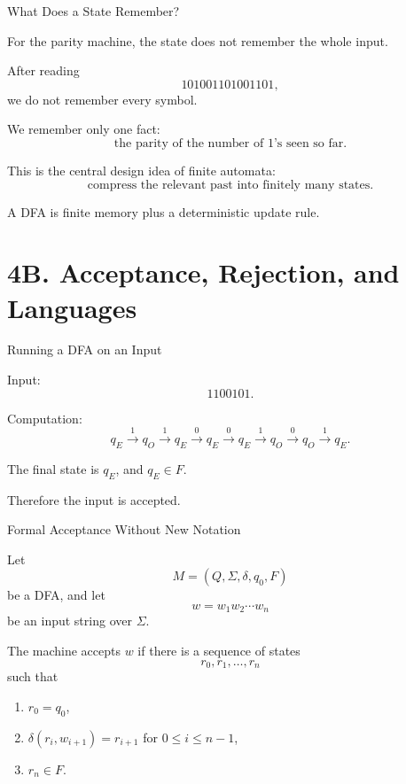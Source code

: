 \documentclass[10pt,aspectratio=169]{beamer}
\begin{document}
\begin{frame}{What Does a State Remember?}

For the parity machine, the state does not remember the whole input.

\pause

After reading
\[
101001101001101,
\]
we do not remember every symbol.

\pause

We remember only one fact:
\[
\text{the parity of the number of }1\text{'s seen so far}.
\]

\pause

This is the central design idea of finite automata:
\[
\text{compress the relevant past into finitely many states.}
\]

\end{frame}

\begin{frame}[standout]
A DFA is finite memory plus a deterministic update rule.
\end{frame}

\section{4B. Acceptance, Rejection, and Languages}

\begin{frame}{Running a DFA on an Input}

Input:
\[
1100101.
\]

\pause

Computation:
\[
q_E
\xrightarrow{1}
q_O
\xrightarrow{1}
q_E
\xrightarrow{0}
q_E
\xrightarrow{0}
q_E
\xrightarrow{1}
q_O
\xrightarrow{0}
q_O
\xrightarrow{1}
q_E.
\]

\pause

The final state is $q_E$, and $q_E\in F$.

Therefore the input is accepted.

\end{frame}

\begin{frame}{Formal Acceptance Without New Notation}

Let
\[
M=(Q,\Sigma,\delta,q_0,F)
\]
be a DFA, and let
\[
w=w_1w_2\cdots w_n
\]
be an input string over $\Sigma$.

\pause

The machine accepts $w$ if there is a sequence of states
\[
r_0,r_1,\ldots,r_n
\]
such that

\begin{enumerate}
\item $r_0=q_0$,
\item $\delta(r_i,w_{i+1})=r_{i+1}$ for $0\le i\le n-1$,
\item $r_n\in F$.
\end{enumerate}

\end{frame}
\end{document}
